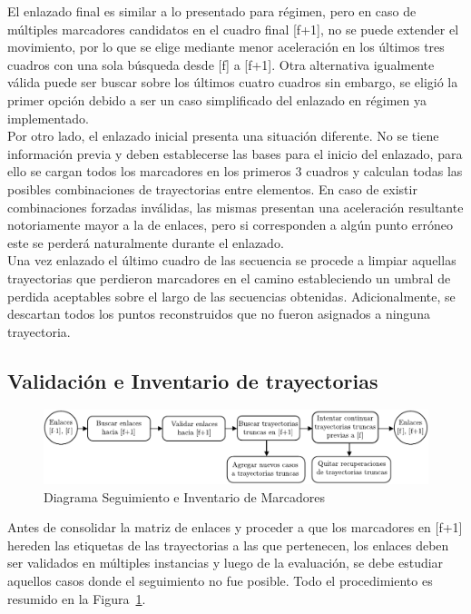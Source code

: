 El enlazado final es similar a lo presentado para régimen, pero en caso de múltiples marcadores candidatos en el cuadro final [f+1], no se puede extender el movimiento, por lo que se elige mediante menor aceleración en los últimos tres cuadros con una sola búsqueda desde [f] a [f+1]. Otra alternativa igualmente válida puede ser buscar sobre los últimos cuatro cuadros sin embargo, se eligió la primer opción debido a ser un caso simplificado del enlazado en régimen ya implementado. 
\\ 

Por otro lado, el enlazado inicial presenta una situación diferente. No se tiene información previa y deben establecerse las bases para el inicio del enlazado, para ello se cargan todos los marcadores en los primeros 3 cuadros y calculan todas las posibles combinaciones de trayectorias entre elementos. En caso de existir combinaciones forzadas inválidas, las mismas presentan una aceleración resultante notoriamente mayor a la de enlaces, pero si corresponden a algún punto erróneo este se perderá naturalmente durante el enlazado.
\\ 

Una vez enlazado el último cuadro de las secuencia se procede a limpiar aquellas trayectorias que perdieron marcadores en el camino estableciendo un umbral de perdida aceptables sobre el largo de las secuencias obtenidas. Adicionalmente, se descartan todos los puntos reconstruidos que no fueron asignados a ninguna trayectoria. 


\subsection{Validación e Inventario de trayectorias}

\begin{figure}[ht!]
\hspace{-1cm}
\includegraphics[scale=0.71]{img/Tracking/diagrama_inventario_seguimiento}
\caption{Diagrama Seguimiento e Inventario de Marcadores}
\label{diagrama_inventario_seguimiento}
\end{figure}

Antes de consolidar la matriz de enlaces y proceder a que los marcadores en [f+1] hereden las etiquetas de las trayectorias a las que pertenecen, los enlaces deben ser validados en múltiples instancias y luego de la evaluación, se debe estudiar aquellos casos donde el seguimiento no fue posible. Todo el procedimiento es resumido en la Figura~\ref{diagrama_inventario_seguimiento}.

